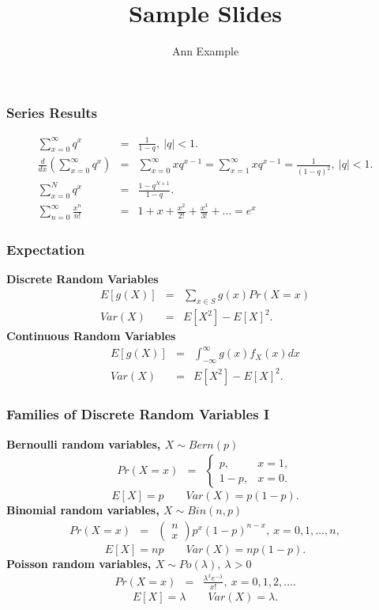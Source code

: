 \documentclass[serif,10pt,compress]{beamer}
\title{Sample Slides}
\author{Ann Example}
\institute{}
\date{}
\begin{document}
\begin{frame}[t]
	\frametitle{Series Results}
	\begin{eqnarray*}
		\sum_{x=0}^{\infty} q^x &=& \frac{1}{1-q}, \ |q|<1. \\
		\frac{d}{dx}\left(\sum_{x=0}^{\infty} q^x \right) &=& \sum_{x=0}^{\infty} xq^{x-1}=\sum_{x=1}^{\infty} xq^{x-1} = \frac{1}{(1-q)^2}, \ |q|<1. \\
		\sum_{x=0}^{N} q^x &=& \frac{1-q^{N+1}}{1-q}. \\
		\sum_{n=0}^{\infty} \frac{x^n}{n!} &=& 1+x+\frac{x^2}{2!}+\frac{x^3}{3!}+\ldots = e^x
	\end{eqnarray*}
\end{frame}

\begin{frame}[t]
\frametitle{Expectation}
{\bf Discrete Random Variables}
\begin{eqnarray*}
E[g(X)] &=& \sum_{x \in S} g(x) Pr(X=x) \\
Var(X)  &=& E[X^2] - E[X]^2.
\end{eqnarray*}
{\bf Continuous Random Variables}
\begin{eqnarray*}
E[g(X)] &=&  \int_{-\infty}^{\infty} g(x) f_X(x) dx \\
Var(X)  &=& E[X^2]-E[X]^2.
\end{eqnarray*}
\end{frame}

\begin{frame}[t]
\frametitle{Families of Discrete Random Variables I}
{\bf Bernoulli random variables, $X \sim Bern(p)$}
\begin{eqnarray*}
Pr(X=x) &=& \left\{ \begin{array}{cc} p, & x=1, \\ 1-p, & x=0. \end{array} \right.
\end{eqnarray*}
\[
E[X] = p \qquad Var(X) = p(1-p).
\]
{\bf Binomial random variables, $X \sim Bin(n,p)$} 
\begin{eqnarray*}
Pr(X=x) &=& \left( \begin{array}{c} n \\ x
      \end{array} \right) p^x (1-p)^{n-x},\  x=0,1,\ldots,n,
\end{eqnarray*}
\[
E[X] = np \qquad Var(X) = np(1-p).
\]
{\bf Poisson random variables, $X \sim Po(\lambda), \ \lambda>0$}
\begin{eqnarray*}
Pr(X=x) &=& \frac{\lambda^x e^{-\lambda}}{x!}, \ x=0,1,2,\ldots.
\end{eqnarray*}
\[
E[X] = \lambda \qquad Var(X) = \lambda.
\]
\end{frame}
\end{document}
